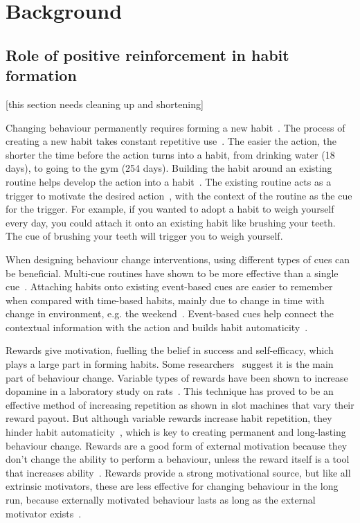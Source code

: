 \documentclass{scaffold/sigchi}
\begin{document}
\section{Background}
\subsection{Role of positive reinforcement in habit formation}
[this section needs cleaning up and shortening]

Changing behaviour permanently requires forming a new habit~\cite{article_experiences_of_habit_formation}. The process of creating a new habit takes constant repetitive use~\cite{article_how_habits_formed_modelling_habit_formation}. The easier the action, the shorter the time before the action turns into a habit, from drinking water (18 days), to going to the gym (254 days). Building the habit around an existing routine helps develop the action into a habit~\cite{habits_event_cues_1}. The existing routine acts as a trigger to motivate the desired action~\cite{habits_event_cues_2}, with the context of the routine as the cue for the trigger. For example, if you wanted to adopt a habit to weigh yourself every day, you could attach it onto an existing habit like brushing your teeth. The cue of brushing your teeth will trigger you to weigh yourself.


When designing behaviour change interventions, using different types of cues can be beneficial. Multi-cue routines have shown to be more effective than a single cue~\cite{article_understanding_use_contextual_cues_design_impl}. Attaching habits onto existing event-based cues are easier to remember~\cite{article_implementation_intentions_multicue} when compared with time-based habits, mainly due to change in time with change in environment, e.g. the weekend~\cite{coaching_not_that_good}. Event-based cues help connect the contextual information with the action and builds habit automaticity~\cite{article_implementation_intentions}.
 
Rewards give motivation, fuelling the belief in success and self-efficacy, which plays a large part in forming habits. Some researchers~\cite{article_a_self_efficacy} suggest it is the main part of behaviour change. Variable types of rewards have been shown to increase dopamine in a laboratory study on rats~\cite{variable_rewards_increases_dopamine}. This technique has proved to be an effective method of increasing repetition as shown in slot machines that vary their reward payout. But although variable rewards increase habit repetition, they hinder habit automaticity~\cite{variable_rewards_increases_dopamine}, which is key to creating permanent and long-lasting behaviour change. Rewards are a good form of external motivation because they don't change the ability to perform a behaviour, unless the reward itself is a tool that increases ability~\cite{article_taxonomy_motivational_affordances_meaningful}. Rewards provide a strong motivational source, but like all extrinsic motivators, these are less effective for changing behaviour in the long run, because externally motivated behaviour lasts as long as the external motivator exists~\cite{article_beyond_self_tracking_designing_apps}.
\end{document}
